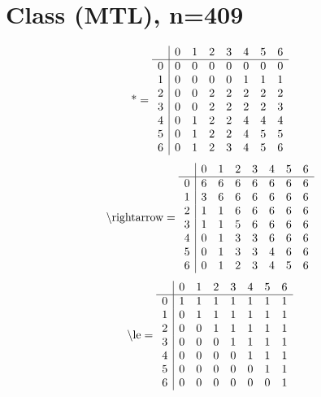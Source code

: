 \documentclass[11pt]{article}
\begin{document}
\section{Class (MTL), n=409}
\[\text{*} = 
\begin{array}{r | r r r r r r r}
 & 0 & 1 & 2 & 3 & 4 & 5 & 6 \\ \hline
0 & 0 & 0 & 0 & 0 & 0 & 0 & 0 \\
1 & 0 & 0 & 0 & 0 & 1 & 1 & 1 \\
2 & 0 & 0 & 2 & 2 & 2 & 2 & 2 \\
3 & 0 & 0 & 2 & 2 & 2 & 2 & 3 \\
4 & 0 & 1 & 2 & 2 & 4 & 4 & 4 \\
5 & 0 & 1 & 2 & 2 & 4 & 5 & 5 \\
6 & 0 & 1 & 2 & 3 & 4 & 5 & 6 \\
\end{array}
\]
\[\text{\textbackslash rightarrow} = 
\begin{array}{r | r r r r r r r}
 & 0 & 1 & 2 & 3 & 4 & 5 & 6 \\ \hline
0 & 6 & 6 & 6 & 6 & 6 & 6 & 6 \\
1 & 3 & 6 & 6 & 6 & 6 & 6 & 6 \\
2 & 1 & 1 & 6 & 6 & 6 & 6 & 6 \\
3 & 1 & 1 & 5 & 6 & 6 & 6 & 6 \\
4 & 0 & 1 & 3 & 3 & 6 & 6 & 6 \\
5 & 0 & 1 & 3 & 3 & 4 & 6 & 6 \\
6 & 0 & 1 & 2 & 3 & 4 & 5 & 6 \\
\end{array}
\]
\[\text{\textbackslash le} = 
\begin{array}{r | r r r r r r r}
 & 0 & 1 & 2 & 3 & 4 & 5 & 6 \\ \hline
0 & 1 & 1 & 1 & 1 & 1 & 1 & 1 \\
1 & 0 & 1 & 1 & 1 & 1 & 1 & 1 \\
2 & 0 & 0 & 1 & 1 & 1 & 1 & 1 \\
3 & 0 & 0 & 0 & 1 & 1 & 1 & 1 \\
4 & 0 & 0 & 0 & 0 & 1 & 1 & 1 \\
5 & 0 & 0 & 0 & 0 & 0 & 1 & 1 \\
6 & 0 & 0 & 0 & 0 & 0 & 0 & 1 \\
\end{array}
\]
\end{document}
